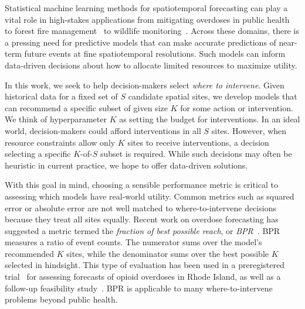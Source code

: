 Statistical machine learning methods for spatiotemporal forecasting can play a vital role in high-stakes applications from mitigating overdoses in public health~\citep{marksMethodologicalApproachesPrediction2021} to forest fire management~\citep{cheng2008ForestFire} to wildlife monitoring~\citep{golden2022SpatialPredictionWhooping,hefley2017DynamicSpatiotemporalWastingDisease}.
Across these domains, there is a pressing need for predictive models that can make accurate predictions of near-term future events at fine spatiotemporal resolutions.
Such models can inform data-driven decisions about how to allocate limited resources to maximize utility.


In this work, we seek to help decision-makers select \emph{where to intervene}. Given historical data for a fixed set of $S$ candidate spatial sites, we develop models that can recommend a specific subset of given size $K$ for some action or intervention. We think of hyperparameter $K$ as setting the budget for interventions. In an ideal world, decision-makers could afford interventions in all $S$ sites. However, when resource constraints allow only $K$ sites to receive interventions, a decision selecting a specific $K$-of-$S$ subset is required. While such decisions may often be heuristic in current practice, we hope to offer data-driven solutions.

With this goal in mind, choosing a sensible performance metric is critical to assessing which models have real-world utility.
Common metrics such as squared error or absolute error are not well matched to where-to-intervene decisions because they treat all sites equally.
Recent work on overdose forecasting has suggested a metric termed the \emph{fraction of best possible reach}, or \emph{BPR}~\citep{heutonZIGP2022,heutonSpatiotemporalForecastingOpioidrelated2024}. BPR measures a ratio of event counts. The numerator sums over the model's recommended $K$ sites, while the denominator sums over the best possible $K$ selected in hindsight. This type of evaluation has been used in a preregistered trial~\citep{marshallPreventingOverdoseUsing2022} for assessing forecasts of opioid overdoses in Rhode Island, as well as a follow-up feasibility study~\citep{allenTranslatingPredictiveAnalytics2023}. BPR is applicable to many where-to-intervene problems beyond public health.

